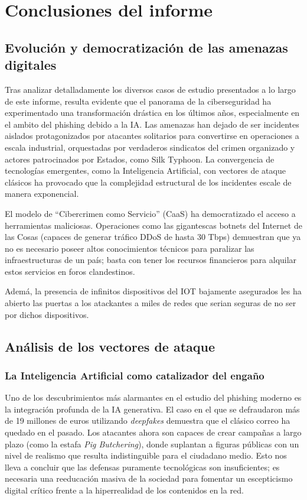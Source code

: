 \chapter{Conclusiones del informe}

\section{Evolución y democratización de las amenazas digitales}
Tras analizar detalladamente los diversos casos de estudio presentados a lo largo de este informe, resulta evidente que el panorama de la ciberseguridad ha experimentado una transformación drástica en los últimos años, especialmente en el ambito del phishing debido a la IA. Las amenazas han dejado de ser incidentes aislados protagonizados por atacantes solitarios para convertirse en operaciones a escala industrial, orquestadas por verdaderos sindicatos del crimen organizado y actores patrocinados por Estados, como Silk Typhoon. La convergencia de tecnologías emergentes, como la Inteligencia Artificial, con vectores de ataque clásicos ha provocado que la complejidad estructural de los incidentes escale de manera exponencial. 

El modelo de ``Cibercrimen como Servicio'' (CaaS) ha democratizado el acceso a herramientas maliciosas. Operaciones como las gigantescas botnets del Internet de las Cosas (capaces de generar tráfico DDoS de hasta 30 Tbps) demuestran que ya no es necesario poseer altos conocimientos técnicos para paralizar las infraestructuras de un país; basta con tener los recursos financieros para alquilar estos servicios en foros clandestinos.

Ademá, la presencia de infinitos dispositivos del IOT bajamente asegurados les ha abierto las puertas a los atackantes a miles de redes que serian seguras de no ser por dichos dispositivos.
\section{Análisis de los vectores de ataque}

\subsection{La Inteligencia Artificial como catalizador del engaño}
Uno de los descubrimientos más alarmantes en el estudio del phishing moderno es la integración profunda de la IA generativa. El caso en el que se defraudaron más de 19 millones de euros utilizando \textit{deepfakes} demuestra que el clásico correo ha quedado en el pasado. Los atacantes ahora son capaces de crear campañas a largo plazo (como la estafa \textit{Pig Butchering}), donde suplantan a figuras públicas con un nivel de realismo que resulta indistinguible para el ciudadano medio. Esto nos lleva a concluir que las defensas puramente tecnológicas son insuficientes; es necesaria una reeducación masiva de la sociedad para fomentar un escepticismo digital crítico frente a la hiperrealidad de los contenidos en la red.

